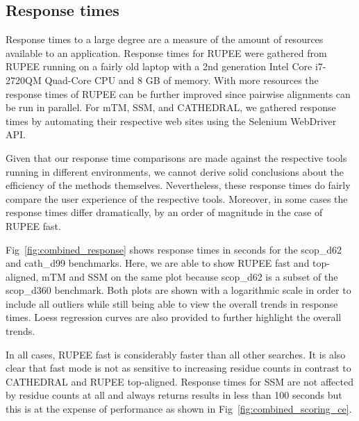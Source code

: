 \documentclass[10pt,letterpaper]{article}
\renewcommand{\figurename}{Fig}
\begin{document}
\subsection*{Response times}

Response times to a large degree are a measure of the amount of resources available to an application. 
Response times for RUPEE were gathered from RUPEE running on a fairly old laptop with a 2nd generation Intel\textregistered{} Core\texttrademark{} i7-2720QM Quad-Core CPU and 8 GB of memory. 
With more resources the response times of RUPEE can be further improved since pairwise alignments can be run in parallel. 
For mTM, SSM, and CATHEDRAL, we gathered response times by automating their respective web sites using the Selenium WebDriver API. 

Given that our response time comparisons are made against the respective tools running in different environments, we cannot derive solid conclusions about the efficiency of the methods themselves. 
Nevertheless, these response times do fairly compare the user experience of the respective tools. 
Moreover, in some cases the response times differ dramatically, by an order of magnitude in the case of RUPEE fast. 

\figurename~\ref{fig:combined_response} shows response times in seconds for the scop\_d62 and cath\_d99 benchmarks. 
Here, we are able to show RUPEE fast and top-aligned, mTM and SSM on the same plot because scop\_d62 is a subset of the scop\_d360 benchmark. 
Both plots are shown with a logarithmic scale in order to include all outliers while still being able to view the overall trends in response times. 
Loess regression curves are also provided to further highlight the overall trends. 

\begin{figure*}[h!]
\caption{Response times for RUPEE fast and RUPEE top-aligned. The response times for RUPEE top-aligned are dominated by pairwise structure alignments and do not depend on the sort order.}
\label{fig:combined_response}
\end{figure*}

In all cases, RUPEE fast is considerably faster than all other searches. 
It is also clear that fast mode is not as sensitive to increasing residue counts in contrast to CATHEDRAL and RUPEE top-aligned.
Response times for SSM are not affected by residue counts at all and always returns results in less than 100 seconds but this is at the expense of performance as shown in \figurename~\ref{fig:combined_scoring_ce}.
\end{document}
